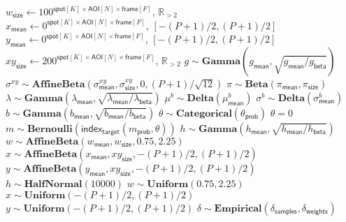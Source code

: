 \begin{algorithmic}[1]
{    $w_\mathsf{size} \gets 100^{\mathsf{spot}[K] \times \mathsf{AOI}[N] \times \mathsf{frame}[F]}$, \quad $\mathbb{R}_{>2}$ \\
    $x_\mathsf{mean} \gets 0^{\mathsf{spot}[K] \times \mathsf{AOI}[N] \times \mathsf{frame}[F]}$, \quad $[-(P+1)/2, (P+1)/2]$ \\
    $y_\mathsf{mean} \gets 0^{\mathsf{spot}[K] \times \mathsf{AOI}[N] \times \mathsf{frame}[F]}$, \quad $[-(P+1)/2, (P+1)/2]$ \\
    $xy_\mathsf{size} \gets 200^{\mathsf{spot}[K] \times \mathsf{AOI}[N] \times \mathsf{frame}[F]}$, \quad $\mathbb{R}_{>2}$
    }
\State $g \sim \mathbf{Gamma}(g_\mathsf{mean}, \sqrt{g_\mathsf{mean} / g_\mathsf{beta}})$
\State $\sigma^{xy} \sim \mathbf{AffineBeta}(\sigma^{xy}_\mathsf{mean}, \sigma^{xy}_\mathsf{size}, 0, (P+1) / \sqrt{12})$
\State $\pi \sim \mathbf{Beta}(\pi_\mathsf{mean}, \pi_\mathsf{size})$
\State $\lambda \sim \mathbf{Gamma}(\lambda_\mathsf{mean}, \sqrt{\lambda_\mathsf{mean} / \lambda_\mathsf{beta}})$
    \State $\mu^b \sim \mathbf{Delta}(\mu^b_\mathsf{mean})$
    \State $\sigma^b \sim \mathbf{Delta}(\sigma^b_\mathsf{mean})$
        \State $b \sim \mathbf{Gamma}(b_\mathsf{mean}, \sqrt{b_\mathsf{mean} / b_\mathsf{beta}})$
            \State $\theta \sim \mathbf{Categorical}\left( \theta_\mathsf{prob} \right)$
            \State $\theta = 0$
        \EndIf
            \State $m \sim \mathbf{Bernoulli}(\mathsf{index}_\mathsf{target} (m_\mathsf{prob}, \theta))$
                \State $h \sim \mathbf{Gamma}(h_\mathsf{mean}, \sqrt{h_\mathsf{mean} / h_\mathsf{beta}})$
                \State $w \sim \mathbf{AffineBeta}(w_\mathsf{mean}, w_\mathsf{size}, 0.75, 2.25)$
                \State $x \sim \mathbf{AffineBeta} \left( x_\mathsf{mean}, xy_\mathsf{size}, -(P+1)/2, (P+1)/2 \right) $
                \State $y \sim \mathbf{AffineBeta} \left( y_\mathsf{mean}, xy_\mathsf{size}, -(P+1)/2, (P+1)/2 \right)$
                \State $h \sim \mathbf{HalfNormal}(10000)$
                \State $w \sim \mathbf{Uniform}(0.75, 2.25)$
                \State $x \sim \mathbf{Uniform}(-(P+1)/2, (P+1)/2)$
                \State $y \sim \mathbf{Uniform}(-(P+1)/2, (P+1)/2)$
            \EndIf
        \EndFor
            \State $\delta \sim \mathbf{Empirical}( \delta_\mathsf{samples}, \delta_\mathsf{weights})$
        \EndFor
    \EndFor
\EndFor
\end{algorithmic}